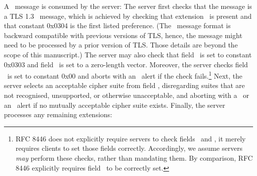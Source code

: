 A \ClientHello\ message is consumed by the server: The 
server first checks that the message is a TLS 1.3 \ClientHello\ 
message, which is achieved by checking that extension \TLSsupportedVersions\
is present and that constant 0x0304 is the first listed preference.
(The \ClientHello\ message format is backward compatible with 
previous versions of TLS, hence, the message might need to be processed
by a prior version of TLS. Those details are beyond the scope of this 
manuscript.) The server may 
also check that field \TLSlegacyVersion\
is set to constant 0x0303 and field \TLSlegacySessionId\ is set to a zero-length vector.
Moreover, the server checks field \TLSlegacyCompressionModes\ is set to constant 0x00
and aborts with an \TLSillegalParameter\ alert if the check fails.\footnote{%
  RFC 8446 does not explicitly require servers to check fields 
  \TLSlegacyVersion\ and \TLSlegacySessionId, it merely requires clients to
  set those fields correctly. Accordingly, we assume servers \emph{may} 
  perform these checks, rather than mandating them. By comparison,
  RFC 8446 explicitly requires field \TLSlegacyCompressionModes\ to be
  correctly set.
}
Next,\label{comp:CH:cons:cipher} the server selects an acceptable cipher suite from field \TLScipherSuites, 
disregarding suites that are not recognised, unsupported, or otherwise unacceptable, 
and aborting with a \TLShandshakeFailure\ or an \TLSinsufficientSecurity\ alert if no 
mutually acceptable cipher suite exists. Finally, the server processes any remaining
extensions:


